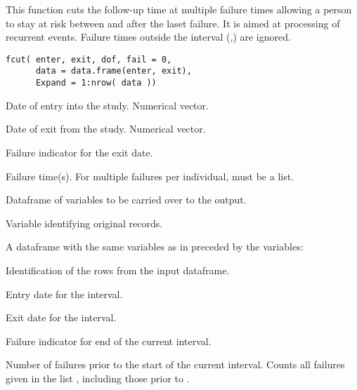 \begin{Description}\relax
This function cuts the follow-up time at multiple failure times
allowing a person to stay at risk between and after the laset
failure. It is aimed at processing of recurrent events. Failure times
outside the interval (,) are ignored.
\end{Description}
\begin{Usage}
\begin{verbatim}
fcut( enter, exit, dof, fail = 0,
      data = data.frame(enter, exit),
      Expand = 1:nrow( data ))
\end{verbatim}
\end{Usage}
\begin{Arguments}
\begin{ldescription}
\item[\code{enter}] Date of entry into the study. Numerical vector.
\item[\code{exit}] Date of exit from the study. Numerical vector.
\item[\code{fail}] Failure indicator for the exit date.
\item[\code{dof}] Failure time(s). For multiple failures per individual,
 must be a list.
\item[\code{data}] Dataframe of variables to be carried over to the output.
\item[\code{Expand}] Variable identifying original records.
\end{ldescription}
\end{Arguments}
\begin{Value}
A dataframe with the same variables as in  preceded by the
variables:
\begin{ldescription}
\item[\code{Expand}] Identification of the rows from the input dataframe.
\item[\code{Enter}] Entry date for the interval.
\item[\code{Exit}] Exit date for the interval.
\item[\code{Fail}] Failure indicator for end of the current interval.
\item[\code{n.Fail}] Number of failures prior to the start of the current
interval. Counts all failures given in the list ,
including those prior to .
\end{ldescription}
\end{Value}

